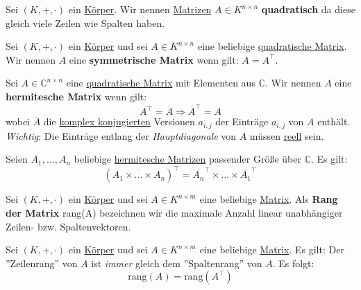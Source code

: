 \documentclass[../../main.tex]{subfiles}
\begin{document}
	\begin{definition}
		\label{def:QuadratischeMatrix}
		Sei $(K,+,\cdot)$ ein \hyperref[def:Körper]{Körper}. Wir nennen \hyperref[def:Matrix]{Matrizen} $A \in K^{n \times n}$ \textbf{quadratisch} da diese gleich viele Zeilen wie Spalten haben. 
	\end{definition}
	
	
	\begin{definition}
		\label{def:SymmetrischeMatrix}
		Sei $(K,+,\cdot)$ ein \hyperref[def:Körper]{Körper} und sei $A\in K^{n \times n}$ eine beliebige \hyperref[def:QuadratischeMatrix]{quadratische Matrix}. Wir nennen $A$ eine \textbf{symmetrische Matrix} wenn gilt: $A=A^\top$. 
	\end{definition}

	\begin{definition}
		\label{def:HermitescheMatrix}
		Sei $A \in \mathbb{C}^{n \times n}$ eine \hyperref[def:QuadratischeMatrix]{quadratische Matrix} mit Elementen aus $\mathbb{C}$. Wir nennen $A$ eine \textbf{hermitesche Matrix} wenn gilt: $$A^\top = \overline{A} \Rightarrow \overline{A}^\top = A$$ wobei $\overline{A}$ die \hyperref[def:komplexKonjugiert]{komplex konjugierten} Versionen $\overline{a_{i,j}}$ der Einträge $a_{i,j}$ von $A$ enthält. \textit{Wichtig}: Die Einträge entlang der \textit{Hauptdiagonale} von $A$ müssen \hyperref[def:ReelleZahlen]{reell} sein. 
	\end{definition}

	\begin{theorem}
		Seien $A_1,...,A_n$ beliebige \hyperref[def:HermitescheMatrix]{hermitesche Matrizen} passender Größe über $\mathbb{C}$. Es gilt: $$(\overline{A_1 \times ... \times A_n})^\top = \overline{A_n}^\top \times ... \times \overline{A_1}^\top$$
	\end{theorem}

	\begin{definition}
		\label{def:RangMatrix}
		Sei $(K,+,\cdot)$ ein \hyperref[def:Körper]{Körper} und sei $A\in K^{n \times m}$ eine beliebige \hyperref[def:Matrix]{Matrix}. Als \textbf{Rang der Matrix} \textrm{rang}(A) bezeichnen wir die maximale Anzahl linear unabhängiger Zeilen- bzw. Spaltenvektoren.
	\end{definition}

	\begin{theorem}
		Sei $(K,+,\cdot)$ ein \hyperref[def:Körper]{Körper} und sei $A\in K^{n \times m}$ eine beliebige \hyperref[def:Matrix]{Matrix}. Es gilt: Der ''Zeilenrang'' von $A$ ist \textit{immer} gleich dem ''Spaltenrang'' von $A$. Es folgt: $$\textrm{rang}(A) = \textrm{rang}(A^\top)$$
	\end{theorem}
\end{document}
